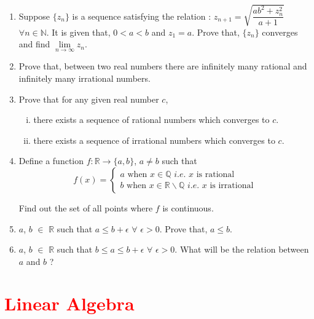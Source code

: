 \documentclass[11pt, a4paper]{article}
\begin{document}
\begin{enumerate}
	\item Suppose $\{z_n\}$ is a sequence satisfying the relation : $z_{n+1} = \sqrt{\dfrac{ab^2 + z_n^2}{a+1}}$ $\forall n \in \mathbb{N}$. It is given that, $0 < a < b$ and $z_1 = a$. Prove that, $\{z_n\}$ converges and find $\lim \limits_{n \rightarrow \infty} z_n$.
	
	\item Prove that, between two real numbers there are infinitely many rational and infinitely many irrational numbers.
	
	\item Prove that for any given real number $c$,
	\begin{enumerate}[(i)]
	\item there exists a sequence of rational numbers which converges to $c$.
	\item there exists a sequence of irrational numbers which converges to $c$.
	\end{enumerate}
	
	\item Define a function $f : \mathbb{R} \rightarrow \{a, b\}$, $a \neq b$ such that
	\begin{equation*}
	f(x) =
		\begin{cases}
		a \text{ when } x \in \mathbb{Q} \textit{ i.e. } x \text{ is rational} \\
		b \text{ when } x \in \mathbb{R \backslash Q} \textit{ i.e. } x \text{ is irrational }
		\end{cases}	
	\end{equation*}
	
Find out the set of all points where $f$ is continuous.

	\item $a$, $b$ $\in$ $\mathbb{R}$ such that $a \leq b + \epsilon $ $\forall$ $\epsilon > 0$. Prove that, $a \leq b$.
	
	\item $a$, $b$ $\in$ $\mathbb{R}$ such that $b \leq a \leq b + \epsilon$ $\forall$ $\epsilon > 0$. What will be the relation between $a$ and $b$ ?
	
\end{enumerate}
















\section{\textcolor{red}{Linear Algebra}}
\end{document}
